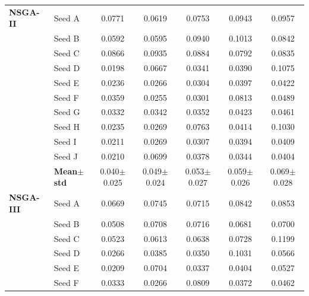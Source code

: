 \begin{table}[H]
{\begin{tabular}{@{}llccccc@{}}
\midrule
 \textbf{NSGA-II} & Seed A & {\small 0.0771} & {\small 0.0619} & {\small 0.0753} & {\small 0.0943} & {\small 0.0957} \\
  & Seed B & {\small 0.0592} & {\small 0.0595} & {\small 0.0940} & {\small 0.1013} & {\small 0.0842} \\
  & Seed C & {\small 0.0866} & {\small 0.0935} & {\small 0.0884} & {\small 0.0792} & {\small 0.0835} \\
  & Seed D & {\small 0.0198} & {\small 0.0667} & {\small 0.0341} & {\small 0.0390} & {\small 0.1075} \\
  & Seed E & {\small 0.0236} & {\small 0.0266} & {\small 0.0304} & {\small 0.0397} & {\small 0.0422} \\
  & Seed F & {\small 0.0359} & {\small 0.0255} & {\small 0.0301} & {\small 0.0813} & {\small 0.0489} \\
  & Seed G & {\small 0.0332} & {\small 0.0342} & {\small 0.0352} & {\small 0.0423} & {\small 0.0461} \\
  & Seed H & {\small 0.0235} & {\small 0.0269} & {\small 0.0763} & {\small 0.0414} & {\small 0.1030} \\
  & Seed I & {\small 0.0211} & {\small 0.0269} & {\small 0.0307} & {\small 0.0394} & {\small 0.0409} \\
  & Seed J & {\small 0.0210} & {\small 0.0699} & {\small 0.0378} & {\small 0.0344} & {\small 0.0404} \\
 & \textbf{Mean$\pm$std} & \cellcolor{ForestGreen!25}0.040$\pm$0.025 & \cellcolor{ForestGreen!25}0.049$\pm$0.024 & \cellcolor{ForestGreen!25}0.053$\pm$0.027 & \cellcolor{ForestGreen!25}0.059$\pm$0.026 & \cellcolor{ForestGreen!25}0.069$\pm$0.028 \\
\midrule
 \textbf{NSGA-III} & Seed A & {\small 0.0669} & {\small 0.0745} & {\small 0.0715} & {\small 0.0842} & {\small 0.0853} \\
  & Seed B & {\small 0.0508} & {\small 0.0708} & {\small 0.0716} & {\small 0.0681} & {\small 0.0700} \\
  & Seed C & {\small 0.0523} & {\small 0.0613} & {\small 0.0638} & {\small 0.0728} & {\small 0.1199} \\
  & Seed D & {\small 0.0266} & {\small 0.0385} & {\small 0.0350} & {\small 0.1031} & {\small 0.0566} \\
  & Seed E & {\small 0.0209} & {\small 0.0704} & {\small 0.0337} & {\small 0.0404} & {\small 0.0527} \\
  & Seed F & {\small 0.0333} & {\small 0.0266} & {\small 0.0809} & {\small 0.0372} & {\small 0.0462} \\

\end{tabular}}
\end{table}
